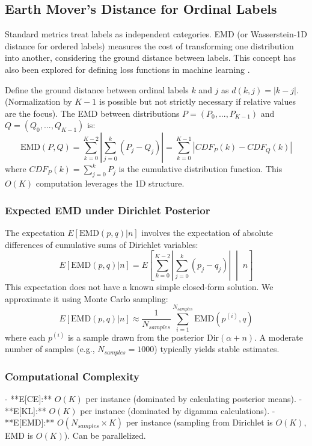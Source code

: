 \documentclass[journal]{IEEEtran}
\begin{document}
\subsection{Earth Mover's Distance for Ordinal Labels}
Standard metrics treat labels as independent categories. EMD (or Wasserstein-1D distance for ordered labels) measures the cost of transforming one distribution into another, considering the ground distance between labels. This concept has also been explored for defining loss functions in machine learning \cite{frogner2015}.

Define the ground distance between ordinal labels $k$ and $j$ as $d(k,j) = |k - j|$. (Normalization by $K-1$ is possible but not strictly necessary if relative values are the focus). The EMD between distributions $P=(P_0,...,P_{K-1})$ and $Q=(Q_0,...,Q_{K-1})$ is:
\begin{equation}
\text{EMD}(P,Q) = \sum_{k=0}^{K-2} |\sum_{j=0}^k (P_j - Q_j)| = \sum_{k=0}^{K-1} |CDF_P(k) - CDF_Q(k)|
\end{equation}
where $CDF_P(k) = \sum_{j=0}^k P_j$ is the cumulative distribution function. This $O(K)$ computation leverages the 1D structure.

\subsubsection{Expected EMD under Dirichlet Posterior}
The expectation $E[\text{EMD}(p,q)|n]$ involves the expectation of absolute differences of cumulative sums of Dirichlet variables:
\begin{equation}
E[\text{EMD}(p,q)|n] = E \left[ \sum_{k=0}^{K-2} |\sum_{j=0}^k (p_j - q_j)| \;\middle|\; n \right]
\end{equation}
This expectation does not have a known simple closed-form solution. We approximate it using Monte Carlo sampling:
\begin{equation}
E[\text{EMD}(p,q)|n] \approx \frac{1}{N_{samples}} \sum_{i=1}^{N_{samples}} \text{EMD}(p^{(i)},q)
\end{equation}
where each $p^{(i)}$ is a sample drawn from the posterior $\text{Dir}(\alpha+n)$. A moderate number of samples (e.g., $N_{samples}=1000$) typically yields stable estimates.

\subsubsection{Computational Complexity}
- **E[CE]:** $O(K)$ per instance (dominated by calculating posterior means).
- **E[KL]:** $O(K)$ per instance (dominated by digamma calculations).
- **E[EMD]:** $O(N_{samples} \times K)$ per instance (sampling from Dirichlet is $O(K)$, EMD is $O(K)$). Can be parallelized.
\end{document}
